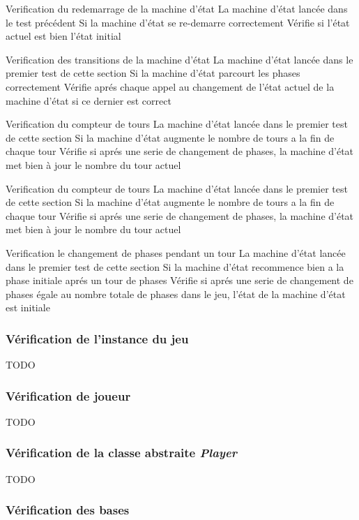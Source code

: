 \mytest
{Verification du redemarrage de la machine d'état}
{La machine d'état lancée dans le test précédent}
{Si la machine d'état se re-demarre correctement}
{Vérifie si l'état actuel est bien l'état initial}

\mytest
{Verification des transitions de la machine d'état}
{La machine d'état lancée dans le premier test de cette section}
{Si la machine d'état parcourt les phases correctement}
{Vérifie aprés chaque appel au changement de l'état actuel de la machine d'état si ce dernier est correct}

\mytest
{Verification du compteur de tours}
{La machine d'état lancée dans le premier test de cette section}
{Si la machine d'état augmente le nombre de tours a la fin de chaque tour}
{Vérifie si aprés une serie de changement de phases, la machine d'état met bien à jour le nombre du tour actuel}

\mytest
{Verification du compteur de tours}
{La machine d'état lancée dans le premier test de cette section}
{Si la machine d'état augmente le nombre de tours a la fin de chaque tour}
{Vérifie si aprés une serie de changement de phases, la machine d'état met bien à jour le nombre du tour actuel}

\mytest
{Verification le changement de phases pendant un tour}
{La machine d'état lancée dans le premier test de cette section}
{Si la machine d'état recommence bien a la phase initiale aprés un tour de phases}
{Vérifie si aprés une serie de changement de phases égale au nombre totale de phases dans le jeu, l'état de la machine d'état est initiale}

\subsubsection{Vérification de l'instance du jeu}


TODO

\subsubsection{Vérification de joueur}

TODO

\subsubsection{Vérification de la classe abstraite \emph{Player}}

TODO

\subsubsection{Vérification des bases}

